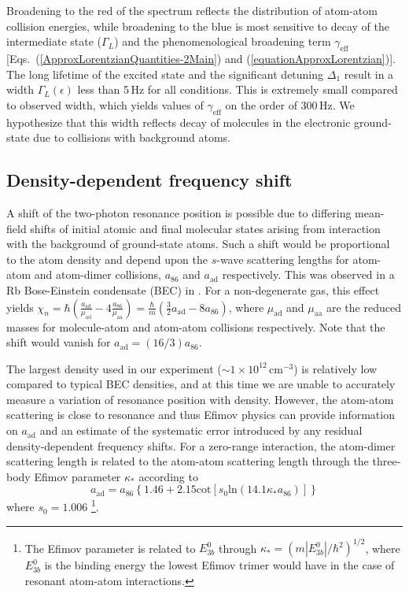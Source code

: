 Broadening to the red of the spectrum reflects the distribution of atom-atom collision energies, while broadening to the blue is most sensitive to decay of the intermediate state ($\Gamma_L$) and the phenomenological broadening term $\gamma_{\text{eff}}$ [Eqs.\ (\ref{ApproxLorentzianQuantities-2Main}) and (\ref{equationApproxLorentzian})]. The long lifetime of the excited state and the significant detuning $\Delta_1$ result in a width $\Gamma_L(\epsilon)$ less than 5\,Hz for all conditions. This is extremely small compared to observed width, which yields values of $\gamma_{\text{eff}}$ on the order of 300\,Hz. We hypothesize that this width reflects decay of molecules in the electronic ground-state due to collisions with background atoms.

\subsection{Density-dependent frequency shift}
A shift of the two-photon resonance position is possible due to differing mean-field shifts of initial atomic and final molecular states arising from interaction with the background of ground-state atoms. Such a shift would be proportional to the atom density and depend upon the $s$-wave scattering lengths for atom-atom and atom-dimer collisions, $a_{86}$ and $a_{\text{ad}}$ respectively. This was observed in a Rb Bose-Einstein condensate (BEC) in \cite{wfh00}. For a non-degenerate gas, this effect yields $\chi_n=\hbar (\frac{a_{\text{ad}}}{\mu_{\text{ad}}}-4\frac{a_{86}}{\mu_{\text{aa}}})=\frac{\hbar}{m} (\frac{3 }{2}a_{\text{ad}}-8 a_{86})$, where $\mu_{\text{ad}}$ and $\mu_{\text{aa}}$ are the reduced masses for molecule-atom and atom-atom collisions respectively. Note that the shift would vanish for $a_{\text{ad}}=(16/3) a_{86}$.

The largest density used in our experiment ($\sim 1\times 10^{12}\,\mathrm{cm}^{-3}$) is relatively low compared to typical BEC densities, and at this time we are unable to accurately measure a variation of resonance position with density. However, the atom-atom scattering is close to resonance and thus Efimov physics can provide information on $a_{\text{ad}}$ \cite{bha07,nen17} and an estimate of the systematic error introduced by any residual density-dependent frequency shifts. For a zero-range interaction, the atom-dimer scattering length is related to the atom-atom scattering length through the three-body Efimov parameter $\kappa_*$ according to \cite{bha07}
\begin{equation}\label{Eq:EfimovMoleculAtomScatteringLength}
  a_{\text{ad}}=a_{86}\left\{1.46 + 2.15 \mathrm{cot}[s_0 \mathrm{ln} (14.1\kappa_* a_{86}) ]\right\}
\end{equation}
where $s_0=1.006$ \footnote{The Efimov parameter is related to $E^0_{3b}$ through $\kappa_*=(m|E^0_{3b}|/\hbar^2)^{1/2}$, where $E^0_{3b}$ is the binding energy the lowest Efimov trimer would have in the case of resonant atom-atom interactions.}.

